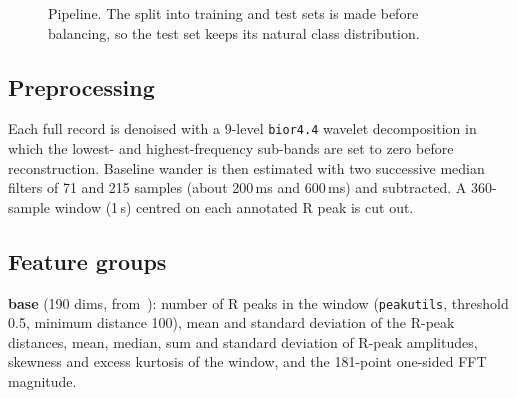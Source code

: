 \documentclass[journal]{IEEEtran}
\begin{document}
\begin{figure}[t]
\centering
{}
\caption{Pipeline. The split into training and test sets is made before balancing, so the test set keeps its natural class distribution.}\label{fig:pipe}
\end{figure}

\subsection{Preprocessing}
Each full record is denoised with a 9-level \texttt{bior4.4} wavelet decomposition in which the lowest- and highest-frequency sub-bands are set to zero before reconstruction. Baseline wander is then estimated with two successive median filters of 71 and 215 samples (about 200\,ms and 600\,ms) and subtracted. A 360-sample window (1\,s) centred on each annotated R peak is cut out.

\subsection{Feature groups}
\textbf{base} (190 dims, from~\cite{subba2024}): number of R peaks in the window (\texttt{peakutils}, threshold 0.5, minimum distance 100), mean and standard deviation of the R-peak distances, mean, median, sum and standard deviation of R-peak amplitudes, skewness and excess kurtosis of the window, and the 181-point one-sided FFT magnitude.
\end{document}
